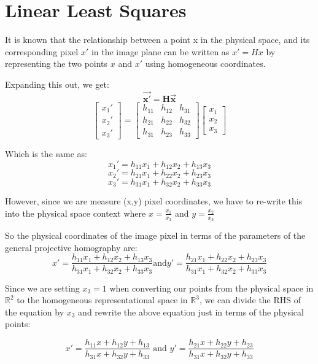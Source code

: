 \documentclass{article}
\begin{document}
\section{Linear Least Squares}
It is known that the relationship between a point x in the physical space, and its corresponding pixel $x'$ in the image plane can be written as \(x' = Hx\) by representing the two points $x$ and $x'$ using homogeneous coordinates.

Expanding this out, we get:
\[\boldsymbol{\Vec{x'}} = \boldsymbol{H} \boldsymbol{\Vec{x}}\]
\[
\begin{bmatrix}
    x_1' \\ x_2' \\ x_3'
\end{bmatrix} = \begin{bmatrix}
    h_{11} & h_{12} & h_{31} \\
    h_{21} & h_{22} & h_{32} \\
    h_{31} & h_{23} & h_{33}
\end{bmatrix} \begin{bmatrix}
    x_1 \\ x_2 \\ x_3
\end{bmatrix}
\] 

Which is the same as:
\[x_1' = h_{11} x_1 + h_{12} x_2 + h_{13} x_3\]
\[x_2' = h_{21} x_1 + h_{22} x_2 + h_{23} x_3\]
\[x_3' = h_{31} x_1 + h_{32} x_2 + h_{33} x_3\]

However, since we are measure (x,y) pixel coordinates, we have to re-write this into the physical space context where $x = \frac{x_1}{x_3}$ and $y = \frac{x_2}{x_3}$

So the physical coordinates of the image pixel in terms of the parameters of the general projective homography are:
\[x' = \frac{h_{11}x_1 + h_{12}x_2 + h_{13}x_3}{h_{31}x_1 + h_{32}x_2 + h_{33}x_3} \text{and} y' = \frac{h_{21}x_1 + h_{22}x_2 + h_{23}x_3}{h_{31}x_1 + h_{32}x_2 + h_{33}x_3}\]

Since we are setting $x_3 = 1$ when converting our points from the physical space in $\mathbb{R}^2$ to the homogeneous representational space in $\mathbb{R}^3$, we can divide the RHS of the equation by $x_3$ and rewrite the above equation just in terms of the physical points:

\[x' = \frac{h_{11}x + h_{12}y + h_{13}}{h_{31}x + h_{32}y + h_{33}} \text{ and } y' = \frac{h_{21}x + h_{22}y + h_{23}}{h_{31}x + h_{32}y + h_{33}}\]
\end{document}
